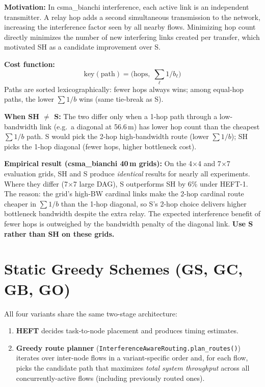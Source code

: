 \documentclass[11pt]{article}
\begin{document}
\medskip
\textbf{Motivation:} In csma\_bianchi interference, each active link is an
independent transmitter.  A relay hop adds a second simultaneous transmission
to the network, increasing the interference factor seen by all nearby flows.
Minimizing hop count directly minimizes the number of new interfering links
created per transfer, which motivated SH as a candidate improvement over S.

\medskip
\textbf{Cost function:}
\[
  \text{key}(\text{path}) = \bigl(\text{hops},\; \textstyle\sum_{\ell} 1/b_\ell\bigr)
\]
Paths are sorted lexicographically: fewer hops always wins; among equal-hop
paths, the lower $\sum 1/b$ wins (same tie-break as S).

\medskip
\textbf{When SH $\neq$ S:} The two differ only when a 1-hop path through a
low-bandwidth link (e.g.\ a diagonal at 56.6\,m) has lower hop count than the
cheapest $\sum 1/b$ path.  S would pick the 2-hop high-bandwidth route (lower
$\sum 1/b$); SH picks the 1-hop diagonal (fewer hops, higher bottleneck cost).

\medskip
\textbf{Empirical result (csma\_bianchi 40\,m grids):} On the 4$\times$4 and
7$\times$7 evaluation grids, SH and S produce \emph{identical} results for
nearly all experiments.  Where they differ (7$\times$7 large DAG), S
outperforms SH by 6\% under HEFT-1.  The reason: the grid's high-BW cardinal
links make the 2-hop cardinal route cheaper in $\sum 1/b$ than the 1-hop
diagonal, so S's 2-hop choice delivers higher bottleneck bandwidth despite the
extra relay.  The expected interference benefit of fewer hops is outweighed by
the bandwidth penalty of the diagonal link.  \textbf{Use S rather than SH on
these grids.}

\section{Static Greedy Schemes (GS, GC, GB, GO)}

All four variants share the same two-stage architecture:

\begin{enumerate}
\item \textbf{HEFT} decides task-to-node placement and produces timing estimates.
\item \textbf{Greedy route planner}
      (\texttt{InterferenceAwareRouting.plan\_routes()}) iterates over
      inter-node flows in a variant-specific order and, for each flow, picks
      the candidate path that maximizes \emph{total system throughput} across
      all concurrently-active flows (including previously routed ones).
\end{enumerate}
\end{document}
